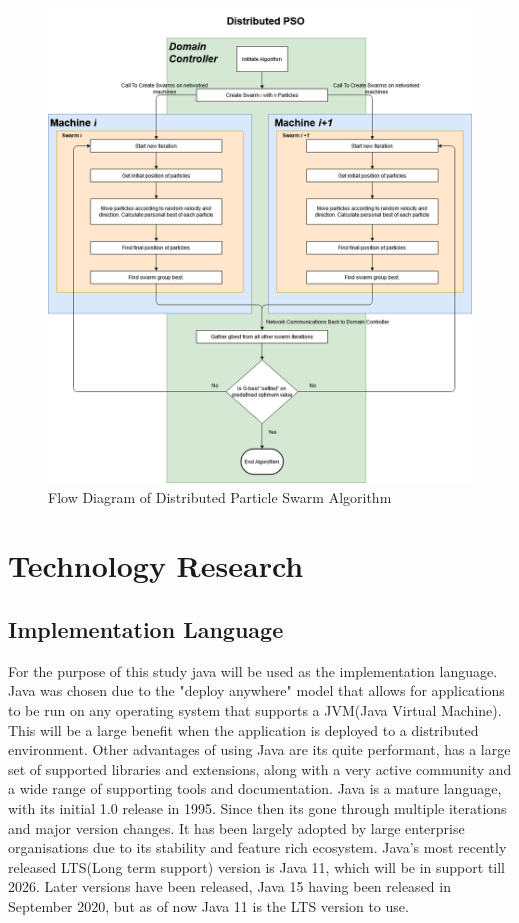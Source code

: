 \documentclass[oneside,12pt]{book}
\begin{document}
\begin{figure}[H]
    \centering
    \includegraphics[scale=0.25]{Images/FlowDiagramDistibutedPSO.png}
    \caption{Flow Diagram of Distributed Particle Swarm Algorithm}
    \label{fig:Flow Diagram of Distributed Particle Swarm Algorithm}
\end{figure}

\section{Technology Research}
\subsection{Implementation Language}
For the purpose of this study java will be used as the implementation language. Java was chosen due to the "deploy anywhere" model that allows for applications to be run on any operating system that supports a JVM(Java Virtual Machine). This will be a large benefit when the application is deployed to a distributed environment. Other advantages of using Java are its quite performant, has a large set of supported libraries and extensions, along with a very active community and a wide range of supporting tools and documentation. 
Java is a mature language, with its initial 1.0 release in 1995. Since then its gone through multiple iterations and major version changes. It has been largely adopted by  large enterprise organisations due to its stability and feature rich ecosystem. Java's most recently released LTS(Long term support) version is Java 11, which will be in support till 2026. Later versions have been released, Java 15 having been released in September 2020,  but as of now Java 11 is the LTS version to use. 
\end{document}

